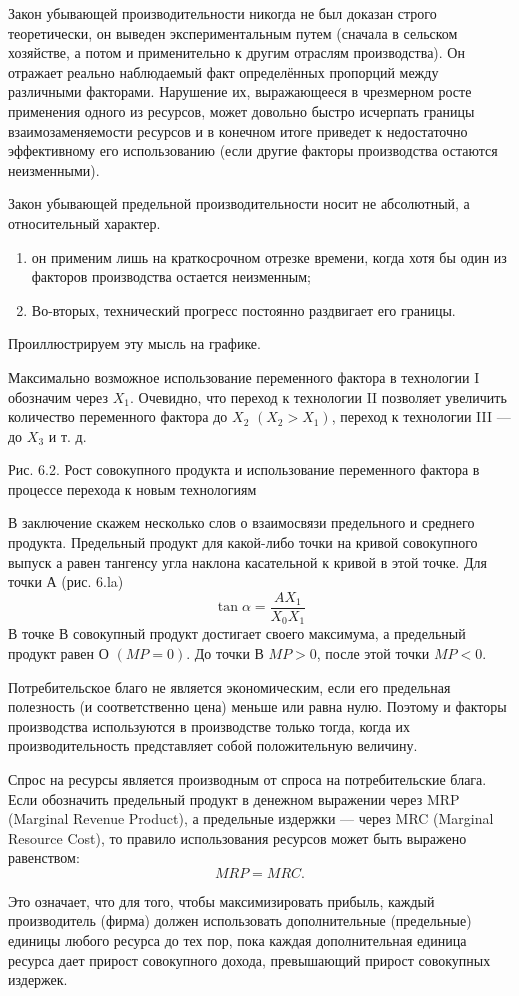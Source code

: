Закон убывающей производительности никогда не был доказан строго теоретически,
он выведен экспериментальным путем (сначала в сельском хозяйстве, а потом и
применительно к другим отраслям производства). Он отражает реально наблюдаемый
факт определённых пропорций между различными факторами. Нарушение их,
выражающееся в чрезмерном росте применения одного из ресурсов, может довольно
быстро исчерпать границы взаимозаменяемости ресурсов и в конечном итоге
приведет к недостаточно эффективному его использованию (если другие факторы
производства остаются неизменными).

Закон убывающей предельной производительности носит не абсолютный, а
относительный характер.
\begin{enumerate}
    \item он применим лишь на краткосрочном отрезке времени, когда хотя бы один
    из факторов производства остается неизменным;
    \item Во-вторых, технический прогресс постоянно раздвигает его границы.
\end{enumerate}

Проиллюстрируем эту мысль на графике.

Максимально возможное использование переменного фактора в технологии I
обозначим через \( X_1 \). Очевидно, что переход к технологии II позволяет
увеличить количество переменного фактора до \( X_2 \) \( (X_2 > X_1) \),
переход к технологии III — до \( X_3 \) и т. д.

Рис. 6.2. Рост совокупного продукта и использование переменного фактора в
процессе перехода к новым технологиям

В заключение скажем несколько слов о взаимосвязи предельного и среднего
продукта. Предельный продукт для какой-либо точки на кривой совокупного выпуск
а равен тангенсу угла наклона касательной к кривой в этой точке. Для точки А
(рис. 6.la)
\[
    \tan\alpha = \frac{AX_1}{X_0X_1}
\]
В точке В совокупный продукт достигает своего максимума, а предельный продукт
равен О \( (MP = 0) \). До точки В \( MP > 0 \), после этой точки \( MP < 0 \).

Потребительское благо не является экономическим, если его предельная полезность
(и соответственно цена) меньше или равна нулю. Поэтому и факторы производства
используются в производстве только тогда, когда их производительность
представляет собой положительную величину.

Спрос на ресурсы является производным от спроса на потребительские блага. Если
обозначить предельный продукт в денежном выражении через MRP (Marginal Revenue
Product), а предельные издержки — через MRC (Marginal Resource Cost), то
правило использования ресурсов может быть выражено равенством:
\[
    MRP = MRC.
\]

Это означает, что для того, чтобы максимизировать прибыль, каждый производитель
(фирма) должен использовать дополнительные (предельные) единицы любого ресурса
до тех пор, пока каждая дополнительная единица ресурса дает прирост совокупного
дохода, превышающий прирост совокупных издержек.

